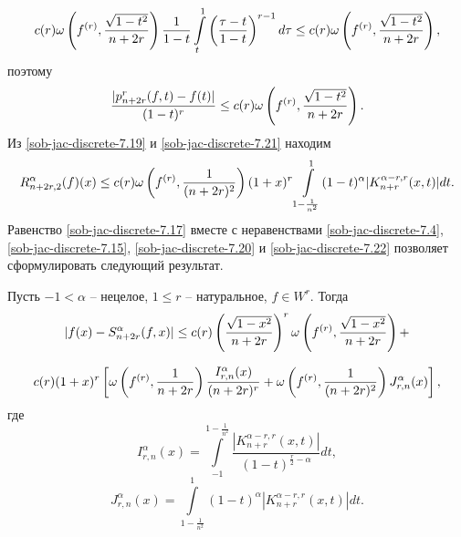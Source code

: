 $$
c(r)\omega\left(f^{(r)},{\sqrt{1-t^2}\over n+2r} \right)\frac{1}{1-t}\int\limits_t^1\left(\frac{\tau-t}{1-t}\right)^{r-1}d\tau\le c(r)\omega\left(f^{(r)},{{\sqrt{1-t^2}\over n+2r} }\right),
$$
поэтому
\begin{equation}\label{sob-jac-discrete-7.21}
\frac{|p_{n+2r}^r(f,t)-f(t)|}{(1-t)^r}\le c(r)\omega\left(f^{(r)},{{\sqrt{1-t^2}\over n+2r} }\right).
\end{equation}
Из \eqref{sob-jac-discrete-7.19} и \eqref{sob-jac-discrete-7.21} находим
\begin{equation}\label{sob-jac-discrete-7.22}
R_{n+2r,2}^\alpha(f)(x)\le c(r)\omega\left(f^{(r)},{1\over (n+2r)^2} \right)(1+x)^r\int\limits_{1-\frac{1}{n^2}}^1(1-t)^{\alpha}|K_{n+r}^{\alpha-r,r}(x,t)|dt.
\end{equation}
Равенство \eqref{sob-jac-discrete-7.17} вместе с неравенствами  \eqref{sob-jac-discrete-7.4}, \eqref{sob-jac-discrete-7.15}, \eqref{sob-jac-discrete-7.20} и \eqref{sob-jac-discrete-7.22} позволяет сформулировать следующий результат.
\begin{theorem}%
Пусть $-1<\alpha$   --  нецелое, $1\le r$ -- натуральное, $f\in W^r$. Тогда
$$
|f(x)-S_{n+2r}^\alpha(f,x)|\le  c(r)\left(\frac{\sqrt{1-x^2}}{n+2r}\right)^{r}\omega\left(f^{(r)},{{\sqrt{1-x^2}\over
n+2r}}\right)+
$$

\begin{equation}\label{sob-jac-discrete-7.23}
c(r)(1+x)^r\left[\omega\left(f^{(r)},{1\over n+2r}\right)\frac{I^\alpha_{r,n}(x)}{(n+2r)^{r}}+\omega\left(f^{(r)},{1\over (n+2r)^2} \right)J^\alpha_{r,n}(x)\right],
\end{equation}
где
\begin{equation}\label{sob-jac-discrete-7.24}
I^\alpha_{r,n}(x)=\int\limits_{-1}^{1-\frac{1}{n^2}}\frac{|K_{n+r}^{\alpha-r,r}(x,t)|}
{(1-t)^{\frac r2-\alpha}}dt,
\end{equation}
\begin{equation}\label{sob-jac-discrete-7.25}
J^\alpha_{r,n}(x)=\int\limits_{1-\frac{1}{n^2}}^1(1-t)^{\alpha}|K_{n+r}^{\alpha-r,r}(x,t)|dt.
\end{equation}
\end{theorem}

